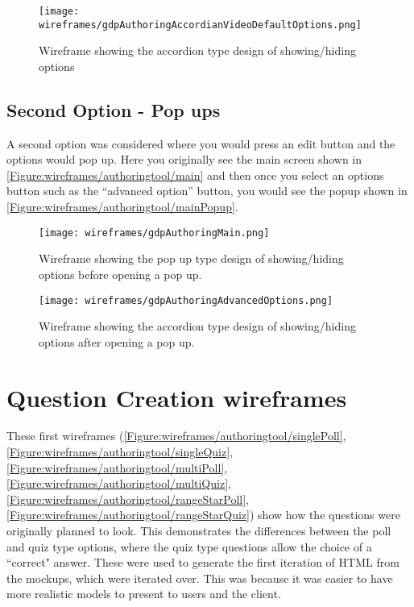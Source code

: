 \begin{figure}
	\texttt{[image: wireframes/gdpAuthoringAccordianVideoDefaultOptions.png]}
	\caption{Wireframe showing the accordion type design of showing/hiding options}
	\label{Figure:wireframes/authoringtool/accordion}
\end{figure}

\subsection{Second Option - Pop ups}

A second option was considered where you would press an edit button and the options would pop up. Here you originally see the main screen shown in \autoref{Figure:wireframes/authoringtool/main} and then once you select an options button such as the ``advanced option'' button, you would see the popup shown in \autoref{Figure:wireframes/authoringtool/mainPopup}.

\begin{landscape}

\begin{figure}
	\texttt{[image: wireframes/gdpAuthoringMain.png]}
	\caption{Wireframe showing the pop up type design of showing/hiding options before opening a pop up.}
	\label{Figure:wireframes/authoringtool/main}
\end{figure}

\begin{figure}
	\texttt{[image: wireframes/gdpAuthoringAdvancedOptions.png]}
	\caption{Wireframe showing the accordion type design of showing/hiding options after opening a pop up.}
	\label{Figure:wireframes/authoringtool/mainPopup}
\end{figure}
\end{landscape}


\section{Question Creation wireframes}

These first wireframes (\autoref{Figure:wireframes/authoringtool/singlePoll}, \autoref{Figure:wireframes/authoringtool/singleQuiz}, \autoref{Figure:wireframes/authoringtool/multiPoll}, \autoref{Figure:wireframes/authoringtool/multiQuiz}, \autoref{Figure:wireframes/authoringtool/rangeStarPoll}, \autoref{Figure:wireframes/authoringtool/rangeStarQuiz}) show how the questions were originally planned to look. This demonstrates the differences between the poll and quiz type options, where the quiz type questions allow the choice of a ``correct" answer. These were used to generate the first iteration of HTML from the mockups, which were iterated over. This was because it was easier to have more realistic models to present to users and the client.

